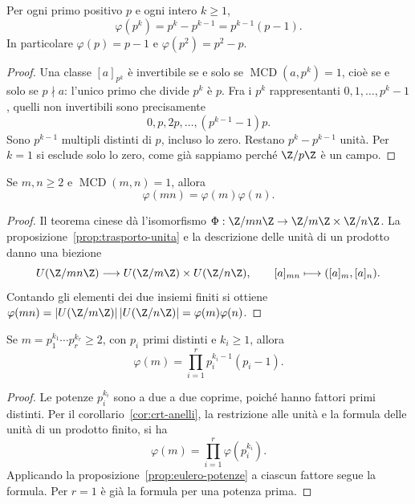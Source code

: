 \begin{proposizione}\label{prop:eulero-potenze}
Per ogni primo positivo $p$ e ogni intero $k\ge1$,
\[
\varphi(p^k)=p^k-p^{k-1}=p^{k-1}(p-1).
\]
In particolare $\varphi(p)=p-1$ e $\varphi(p^2)=p^2-p$.
\end{proposizione}
\begin{proof}
Una classe $[a]_{p^k}$ è invertibile se e solo se $\operatorname{MCD}(a,p^k)=1$, cioè se e solo se $p\nmid a$: l'unico primo che divide $p^k$ è $p$. Fra i $p^k$ rappresentanti $0,1,\ldots,p^k-1$, quelli non invertibili sono precisamente
\[
0,p,2p,\ldots,(p^{k-1}-1)p.
\]
Sono $p^{k-1}$ multipli distinti di $p$, incluso lo zero. Restano $p^k-p^{k-1}$ unità. Per $k=1$ si esclude solo lo zero, come già sappiamo perché $\Z/p\Z$ è un campo.
\end{proof}

\begin{proposizione}\label{prop:eulero-coprimi}
Se $m,n\ge2$ e $\operatorname{MCD}(m,n)=1$, allora
\[
\varphi(mn)=\varphi(m)\varphi(n).
\]
\end{proposizione}
\begin{proof}
Il teorema cinese dà l'isomorfismo $\Phi:\Z/mn\Z\to\Z/m\Z\times\Z/n\Z$. La proposizione~\ref{prop:trasporto-unita} e la descrizione delle unità di un prodotto danno una biezione
\[
U(\Z/mn\Z)\longrightarrow U(\Z/m\Z)\times U(\Z/n\Z),
\qquad [a]_{mn}\longmapsto([a]_m,[a]_n).
\]
Contando gli elementi dei due insiemi finiti si ottiene $\varphi(mn)=|U(\Z/m\Z)|\,|U(\Z/n\Z)|=\varphi(m)\varphi(n)$.
\end{proof}

\begin{corollario}[Formula dalla fattorizzazione]
Se $m=p_1^{k_1}\cdots p_r^{k_r}\ge2$, con $p_i$ primi distinti e $k_i\ge1$, allora
\[
\varphi(m)=\prod_{i=1}^r p_i^{k_i-1}(p_i-1).
\]
\end{corollario}
\begin{proof}
Le potenze $p_i^{k_i}$ sono a due a due coprime, poiché hanno fattori primi distinti. Per il corollario~\ref{cor:crt-anelli}, la restrizione alle unità e la formula delle unità di un prodotto finito, si ha
\[
\varphi(m)=\prod_{i=1}^r\varphi(p_i^{k_i}).
\]
Applicando la proposizione~\ref{prop:eulero-potenze} a ciascun fattore segue la formula. Per $r=1$ è già la formula per una potenza prima.
\end{proof}

